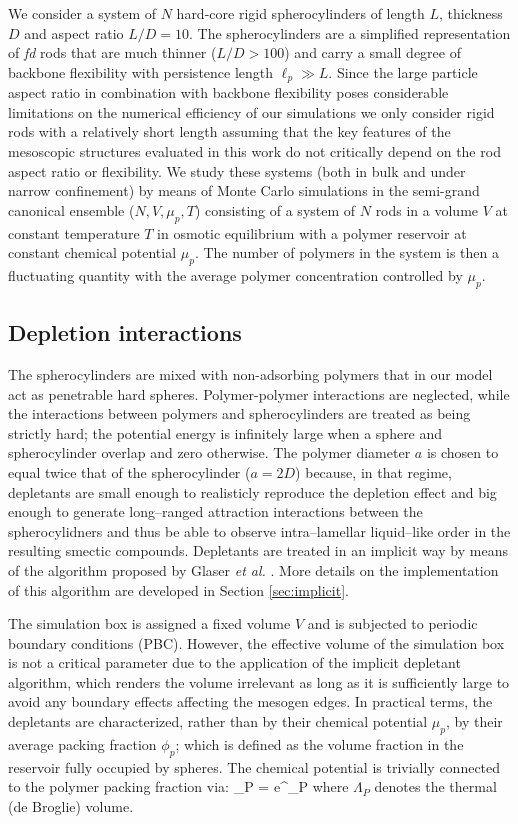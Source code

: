 We consider a system of $N$ hard-core rigid spherocylinders of length $L$, thickness $D$ and aspect ratio $L/D = 10$. The spherocylinders are a simplified representation of {\em fd} rods that are much thinner ($L/D > 100$) and carry a small degree of backbone flexibility with persistence length $\ell_{p} \gg L$. Since the large particle aspect ratio in combination with backbone flexibility poses considerable limitations on the numerical efficiency of our simulations  we  only consider rigid rods with a relatively short length assuming that the key features of the mesoscopic structures evaluated in this work do not  critically depend on the rod aspect ratio or flexibility. We study these systems (both in bulk and under narrow confinement) by means of Monte Carlo simulations in the semi-grand canonical ensemble ($N,V,\mu_{p},T$) consisting of a system of $N$ rods in a volume $V$ at constant temperature $T$ in osmotic equilibrium with a polymer reservoir at constant chemical potential $\mu_{p}$. The number of polymers  in the system is then a fluctuating quantity with the average polymer concentration controlled by $\mu_{p}$.

\subsection{Depletion interactions}

The spherocylinders are mixed with non-adsorbing polymers that in our model act as penetrable hard spheres. Polymer-polymer interactions are neglected, while the interactions between polymers and spherocylinders are treated as being strictly hard;  the potential energy is infinitely large when a sphere and spherocylinder overlap and zero otherwise. The polymer diameter $a$ is chosen to equal twice that of the spherocylinder ($a = 2D$) because, in that regime, depletants are small enough to realisticly reproduce the depletion effect and big enough to generate long--ranged attraction interactions between the spherocylidners and thus be able to observe intra--lamellar liquid--like order in the resulting smectic compounds. Depletants are treated in an implicit way by means of the algorithm proposed by Glaser {\em et al.} \cite{glaser2015parallel}. More details on the implementation of this algorithm are developed in Section \ref{sec:implicit}.

The simulation box is assigned a fixed volume $V$ and is subjected to periodic boundary conditions (PBC). However, the effective volume of the simulation box is not a critical parameter due to the application of the implicit depletant algorithm, which renders the volume irrelevant as long as it is sufficiently large to avoid any boundary effects affecting the mesogen edges. In practical terms, the depletants are characterized, rather than by their chemical potential $\mu_p$,  by their average packing fraction $\phi_p$; which is defined as the volume fraction in the reservoir fully occupied by spheres. The chemical potential is trivially connected to the polymer packing fraction via:
\beq
\phi_{P} =  e^{\beta \mu_{P}}
\eeq
where $\Lambda_{P}$ denotes the thermal (de Broglie) volume.

